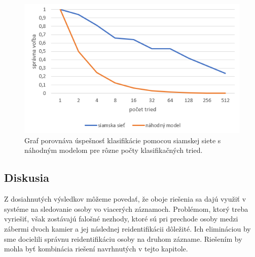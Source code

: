 \begin{figure}[H]
\centerline{\includegraphics[width=1\textwidth]{images/graph_oneshot_body.png}}
\caption[Výsledky klasifikácie podľa tela]{Graf porovnáva úspešnosť klasifikácie pomocou siamskej siete s náhodným modelom pre rôzne počty klasifikačných tried.}
\label{obr:graph_oneshot_body}
\end{figure}

\subsection{Diskusia}
Z dosiahnutých výsledkov môžeme povedať, že oboje riešenia sa dajú využiť v systéme na sledovanie osoby vo viacerých záznamoch.
Problémom, ktorý treba vyriešiť, však zostávajú falošné nezhody, ktoré sú pri prechode osoby medzi zábermi dvoch kamier a jej následnej reidentifikácii dôležité.
Ich elimináciou by sme docielili správnu reidentifikáciu osoby na druhom zázname.
Riešením by mohla byť kombinácia riešení navrhnutých v tejto kapitole.
